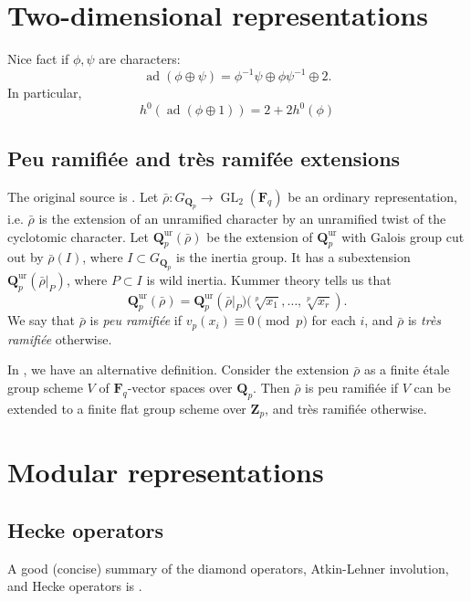 \documentclass{amsart}
\DeclareMathOperator{\adjoint}{ad}
\DeclareMathOperator{\GL}{GL}
\newcommand{\dF}{\mathbf{F}}
\newcommand{\dQ}{\mathbf{Q}}
\newcommand{\dZ}{\mathbf{Z}}
\begin{document}
\section{Two-dimensional representations}

Nice fact if $\phi,\psi$ are characters: 
\[
  \adjoint(\phi\oplus \psi) = \phi^{-1}\psi\oplus \phi\psi^{-1}\oplus 2 .
\]
In particular, 
\[
  h^0(\adjoint(\phi\oplus 1)) = 2+2 h^0(\phi)
\]


\subsection{Peu ramifi\'ee and tr\`es ramif\'ee extensions}

The original source is \cite[2.4.6]{serre-1987}. 
Let $\bar\rho:G_{\dQ_p}\to \GL_2(\dF_q)$ be 
an ordinary representation, i.e. $\bar\rho$ is the extension of an unramified 
character by an unramified twist of the cyclotomic character. Let 
$\dQ_p^\mathrm{ur}(\bar\rho)$ be the extension of $\dQ_p^\mathrm{ur}$ with 
Galois group cut out by $\bar\rho(I)$, where $I\subset G_{\dQ_p}$ is the 
inertia group. It has a subextension $\dQ_p^\mathrm{ur}(\bar\rho|_P)$, where 
$P\subset I$ is wild inertia. Kummer theory tells us that 
\[
  \dQ_p^\mathrm{ur}(\bar\rho) = \dQ_p^\mathrm{ur}\left(\bar\rho|_P)(\sqrt[p]{x_1},\dots,\sqrt[p]{x_r}\right).
\]
We say that $\bar\rho$ is \emph{peu ramifi\'ee} if $v_p(x_i)\equiv 0\pmod p$ 
for each $i$, and $\bar\rho$ is \emph{tr\`es ramifi\'ee} otherwise. 

In \cite[8.2]{edixhoven-1992}, we have an alternative definition. Consider the 
extension $\bar\rho$ as a finite \'etale group scheme $V$ of $\dF_q$-vector 
spaces over $\dQ_p$. Then $\bar\rho$ is peu ramifi\'ee if $V$ can be extended 
to a finite flat group scheme over $\dZ_p$, and tr\`es ramifi\'ee otherwise. 





\section{Modular representations}


\subsection{Hecke operators}

A good (concise) summary of the diamond operators, Atkin-Lehner involution, and 
Hecke operators is \cite[ch.2 \S 5]{mw84}. 
\end{document}
